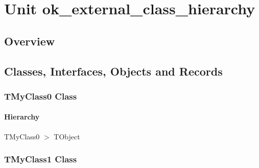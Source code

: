 \documentclass{report}
\newif\ifpdf
\begin{document}
\label{toc}\tableofcontents
\newpage
\newlength{\tmplength}
\chapter{Unit ok{\_}external{\_}class{\_}hierarchy}
\label{ok_external_class_hierarchy}
\section{Overview}
\begin{description}
\item[\texttt{\begin{ttfamily}TMyClass0\end{ttfamily} Class}]
\item[\texttt{\begin{ttfamily}TMyClass1\end{ttfamily} Class}]
\item[\texttt{\begin{ttfamily}TMyClass3\end{ttfamily} Class}]
\end{description}
\section{Classes, Interfaces, Objects and Records}
\ifpdf
\subsection*{\large{\textbf{TMyClass0 Class}}\normalsize\hspace{1ex}\hrulefill}
\else
\subsection*{TMyClass0 Class}
\fi
\label{ok_external_class_hierarchy.TMyClass0}
\subsubsection*{\large{\textbf{Hierarchy}}\normalsize\hspace{1ex}\hfill}
TMyClass0 {$>$} TObject
\ifpdf
\subsection*{\large{\textbf{TMyClass1 Class}}\normalsize\hspace{1ex}\hrulefill}
\else
\end{document}
